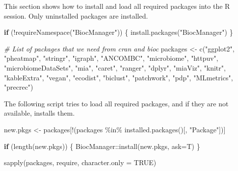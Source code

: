 \documentclass[
  oneside]{book}
\newenvironment{Shaded}{\begin{snugshade}}{\end{snugshade}}
\newcommand{\AttributeTok}[1]{\textcolor[rgb]{0.77,0.63,0.00}{#1}}
\newcommand{\CommentTok}[1]{\textcolor[rgb]{0.56,0.35,0.01}{\textit{#1}}}
\newcommand{\ConstantTok}[1]{\textcolor[rgb]{0.00,0.00,0.00}{#1}}
\newcommand{\ControlFlowTok}[1]{\textcolor[rgb]{0.13,0.29,0.53}{\textbf{#1}}}
\newcommand{\FunctionTok}[1]{\textcolor[rgb]{0.00,0.00,0.00}{#1}}
\newcommand{\NormalTok}[1]{#1}
\newcommand{\OtherTok}[1]{\textcolor[rgb]{0.56,0.35,0.01}{#1}}
\newcommand{\SpecialCharTok}[1]{\textcolor[rgb]{0.00,0.00,0.00}{#1}}
\newcommand{\StringTok}[1]{\textcolor[rgb]{0.31,0.60,0.02}{#1}}
\begin{document}
This section shows how to install and load all required packages into
the R session. Only uninstalled packages are installed.

\begin{Shaded}
\begin{Highlighting}[]
\ControlFlowTok{if}\NormalTok{ (}\SpecialCharTok{!}\FunctionTok{requireNamespace}\NormalTok{(}\StringTok{"BiocManager"}\NormalTok{)) \{}
  \FunctionTok{install.packages}\NormalTok{(}\StringTok{"BiocManager"}\NormalTok{)}
\NormalTok{\}}

\CommentTok{\# List of packages that we need from cran and bioc }
\NormalTok{packages }\OtherTok{\textless{}{-}} \FunctionTok{c}\NormalTok{(}\StringTok{"ggplot2"}\NormalTok{, }\StringTok{"pheatmap"}\NormalTok{, }\StringTok{"stringr"}\NormalTok{, }\StringTok{"igraph"}\NormalTok{, }\StringTok{"ANCOMBC"}\NormalTok{,}
             \StringTok{"microbiome"}\NormalTok{, }\StringTok{"httpuv"}\NormalTok{, }\StringTok{"microbiomeDataSets"}\NormalTok{, }\StringTok{"mia"}\NormalTok{, }\StringTok{"caret"}\NormalTok{, }\StringTok{"ranger"}\NormalTok{,}
            \StringTok{"dplyr"}\NormalTok{, }\StringTok{"miaViz"}\NormalTok{, }\StringTok{"knitr"}\NormalTok{, }\StringTok{"kableExtra"}\NormalTok{, }\StringTok{"vegan"}\NormalTok{, }\StringTok{"ecodist"}\NormalTok{, }\StringTok{"biclust"}\NormalTok{,}
            \StringTok{"patchwork"}\NormalTok{, }\StringTok{"pdp"}\NormalTok{, }\StringTok{"MLmetrics"}\NormalTok{, }\StringTok{"precrec"}\NormalTok{)}
\end{Highlighting}
\end{Shaded}

The following script tries to load all required packages, and if they are not available, installs them.

\begin{Shaded}
\begin{Highlighting}[]
\NormalTok{new.pkgs }\OtherTok{\textless{}{-}}\NormalTok{ packages[}\SpecialCharTok{!}\NormalTok{(packages }\SpecialCharTok{\%in\%} \FunctionTok{installed.packages}\NormalTok{()[, }\StringTok{"Package"}\NormalTok{])]}

\ControlFlowTok{if}\NormalTok{ (}\FunctionTok{length}\NormalTok{(new.pkgs)) \{}
\NormalTok{    BiocManager}\SpecialCharTok{::}\FunctionTok{install}\NormalTok{(new.pkgs, }\AttributeTok{ask=}\NormalTok{T)}
\NormalTok{\}}

\FunctionTok{sapply}\NormalTok{(packages, require, }\AttributeTok{character.only =} \ConstantTok{TRUE}\NormalTok{)}
\end{Highlighting}
\end{Shaded}
\end{document}
